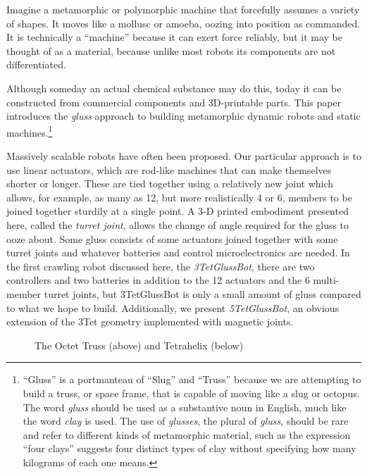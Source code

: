 \documentclass[11pt]{article}
\begin{document}
Imagine a metamorphic or polymorphic machine that forcefully assumes a variety of shapes. It moves like a mollusc or amoeba,
oozing into position as commanded. It is technically a ``machine'' because it can exert force reliably, but
it may be thought of as a material, because unlike most robots its components are not differentiated.

Although someday an actual chemical substance may do this, today it can be constructed from commercial components
and 3D-printable parts. This paper introduces the \emph{gluss} approach to building metamorphic dynamic robots
and static machines.\footnote{ ``Gluss'' is a portmanteau of ``Slug'' and ``Truss'' because we are attempting to
build a truss, or space frame, that is capable of moving like a slug or octopus.
The word \textit{gluss}
should be used as a substantive noun in English, much like the word \textit{clay} is used.
The use of \textit{glusses}, the plural
of \textit{gluss}, should be rare and refer to different kinds of metamorphic material, such as the expression
``four clays'' suggests four distinct types of clay without specifying how many kilograms of each one means.}

Massively scalable robots have often been proposed. Our particular approach is to use linear actuators,
which are rod-like machines that can make themselves shorter or longer. These are tied together using
a relatively new joint \cite{song2003spherical} which allows, for example, as many as 12, but more realistically 4 or 6,
members to be joined together sturdily at a single point.
A 3-D printed embodiment presented here, called the \emph{turret joint}, allows the
change of angle required for the gluss to ooze about. Some gluss consists of some actuators joined together
with some turret joints and whatever batteries and control microelectronics are needed. In the first
crawling robot discussed here, the \emph{3TetGlussBot}, there are two controllers and two batteries
in addition to the 12 actuators and the 6 multi-member turret joints, but 3TetGlussBot is only
a small amount of gluss compared to what we hope to build. Additionally, we present \emph{5TetGlussBot}, an obvious extension of the
3Tet geometry implemented with magnetic joints.

\begin{figure}[!ht]
  \centering
    \caption[The Octet Truss (above) and Tetrahelix (below)]{The Octet Truss (above) and Tetrahelix (below)}
      \label{twogeometries}
\end{figure}
\end{document}
